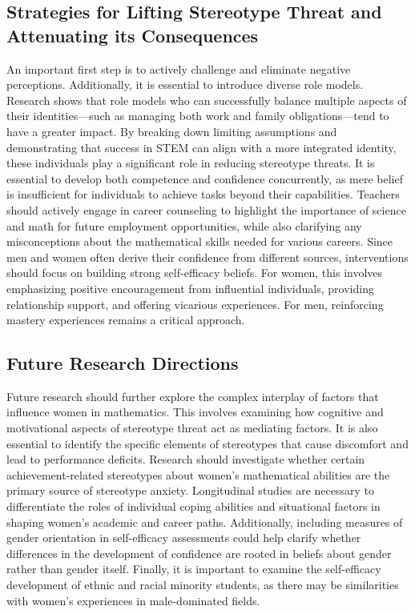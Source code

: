 \subsection{Strategies for Lifting Stereotype Threat and Attenuating its Consequences}
An important first step is to actively challenge and eliminate negative perceptions. Additionally, it is essential to introduce diverse role models. Research shows that role models who can successfully balance multiple aspects of their identities—such as managing both work and family obligations—tend to have a greater impact. By breaking down limiting assumptions and demonstrating that success in STEM can align with a more integrated identity, these individuals play a significant role in reducing stereotype threats.
It is essential to develop both competence and confidence concurrently, as mere belief is insufficient for individuals to achieve tasks beyond their capabilities.
Teachers should actively engage in career counseling to highlight the importance of science and math for future employment opportunities, while also clarifying any misconceptions about the mathematical skills needed for various careers. Since men and women often derive their confidence from different sources, interventions should focus on building strong self-efficacy beliefs. For women, this involves emphasizing positive encouragement from influential individuals, providing relationship support, and offering vicarious experiences. For men, reinforcing mastery experiences remains a critical approach. 
\subsection{Future Research Directions}
Future research should further explore the complex interplay of factors that influence women in mathematics. This involves examining how cognitive and motivational aspects of stereotype threat act as mediating factors. It is also essential to identify the specific elements of stereotypes that cause discomfort and lead to performance deficits. Research should investigate whether certain achievement-related stereotypes about women's mathematical abilities are the primary source of stereotype anxiety. Longitudinal studies are necessary to differentiate the roles of individual coping abilities and situational factors in shaping women's academic and career paths. Additionally, including measures of gender orientation in self-efficacy assessments could help clarify whether differences in the development of confidence are rooted in beliefs about gender rather than gender itself. Finally, it is important to examine the self-efficacy development of ethnic and racial minority students, as there may be similarities with women's experiences in male-dominated fields.

